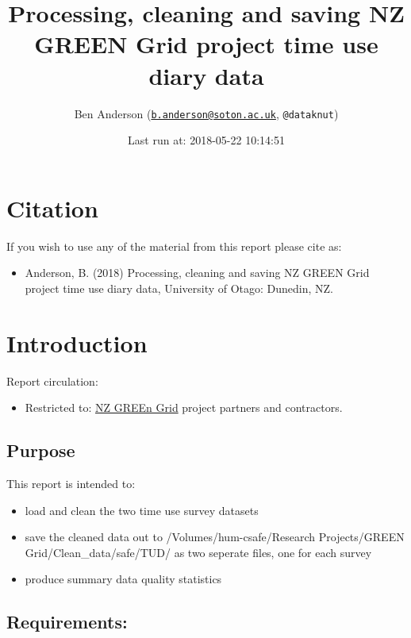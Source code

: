 \documentclass[]{article}
\title{Processing, cleaning and saving NZ GREEN Grid project time use diary
data}
\author{Ben Anderson
(\href{mailto:b.anderson@soton.ac.uk}{\nolinkurl{b.anderson@soton.ac.uk}},
\texttt{@dataknut})}
\date{Last run at: 2018-05-22 10:14:51}
\providecommand{\tightlist}{%
  \setlength{\itemsep}{0pt}\setlength{\parskip}{0pt}}
\begin{document}
\maketitle

{
\setcounter{tocdepth}{2}
\tableofcontents
}
\newpage

\section{Citation}\label{citation}

If you wish to use any of the material from this report please cite as:

\begin{itemize}
\tightlist
\item
  Anderson, B. (2018) Processing, cleaning and saving NZ GREEN Grid
  project time use diary data, University of Otago: Dunedin, NZ.
\end{itemize}

\newpage

\section{Introduction}\label{introduction}

Report circulation:

\begin{itemize}
\tightlist
\item
  Restricted to:
  \href{https://www.otago.ac.nz/centre-sustainability/research/energy/otago050285.html}{NZ
  GREEn Grid} project partners and contractors.
\end{itemize}

\subsection{Purpose}\label{purpose}

This report is intended to:

\begin{itemize}
\tightlist
\item
  load and clean the two time use survey datasets
\item
  save the cleaned data out to /Volumes/hum-csafe/Research
  Projects/GREEN Grid/Clean\_data/safe/TUD/ as two seperate files, one
  for each survey
\item
  produce summary data quality statistics
\end{itemize}

\subsection{Requirements:}\label{requirements}
\end{document}
